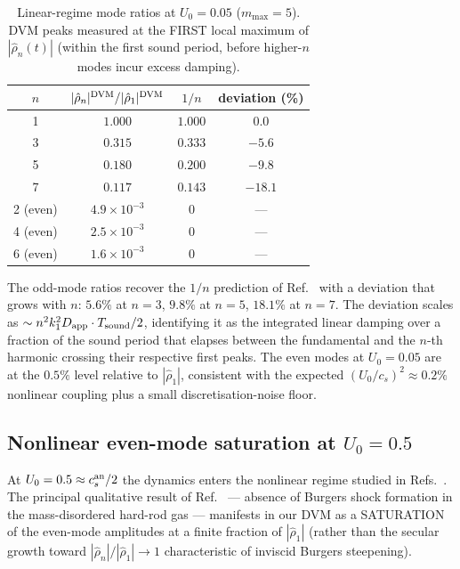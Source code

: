 \documentclass[aps,pre,twocolumn,superscriptaddress,longbibliography,floatfix]{revtex4-2}
\begin{document}
\begin{table}[htbp]
\caption{Linear-regime mode ratios at $U_0=0.05$
($m_{\max}=5$). DVM peaks measured at the FIRST local
maximum of $|\hat\rho_n(t)|$ (within the first sound period,
before higher-$n$ modes incur excess damping).}
\label{tab:moderatio_lin}
\centering
\begin{tabular}{c|ccc}
\hline\hline
$n$ & $|\hat\rho_n|^{\rm DVM}/|\hat\rho_1|^{\rm DVM}$
& $1/n$ & deviation (\%) \\
\hline
1 & $1.000$  & $1.000$ & $0.0$ \\
3 & $0.315$  & $0.333$ & $-5.6$ \\
5 & $0.180$  & $0.200$ & $-9.8$ \\
7 & $0.117$  & $0.143$ & $-18.1$ \\
\hline
2 (even) & $4.9\times 10^{-3}$ & $0$ & --- \\
4 (even) & $2.5\times 10^{-3}$ & $0$ & --- \\
6 (even) & $1.6\times 10^{-3}$ & $0$ & --- \\
\hline\hline
\end{tabular}
\end{table}

The odd-mode ratios recover the $1/n$ prediction of
Ref.~\cite{PaperIV} with a deviation that grows with $n$:
$5.6\%$ at $n=3$, $9.8\%$ at $n=5$, $18.1\%$ at $n=7$. The
deviation scales as $\sim n^2 k_1^2 D_{\rm app}\cdot T_{\rm sound}/2$,
identifying it as the integrated linear damping over a
fraction of the sound period that elapses between the
fundamental and the $n$-th harmonic crossing their respective
first peaks. The even modes at $U_0=0.05$ are at the
$0.5\%$ level relative to $|\hat\rho_1|$, consistent with
the expected $(U_0/c_s)^2\approx 0.2\%$ nonlinear coupling
plus a small discretisation-noise floor.

\subsection{Nonlinear even-mode saturation at $U_0=0.5$}

At $U_0=0.5\approx c_s^{\rm an}/2$ the dynamics enters the
nonlinear regime studied in Refs.~\cite{PaperIII,PaperIV}.
The principal qualitative result of Ref.~\cite{PaperIII} ---
absence of Burgers shock formation in the
mass-disordered hard-rod gas --- manifests in our DVM as a
SATURATION of the even-mode amplitudes at a finite fraction
of $|\hat\rho_1|$ (rather than the secular growth toward
$|\hat\rho_n|/|\hat\rho_1|\to 1$ characteristic of inviscid
Burgers steepening).
\end{document}
